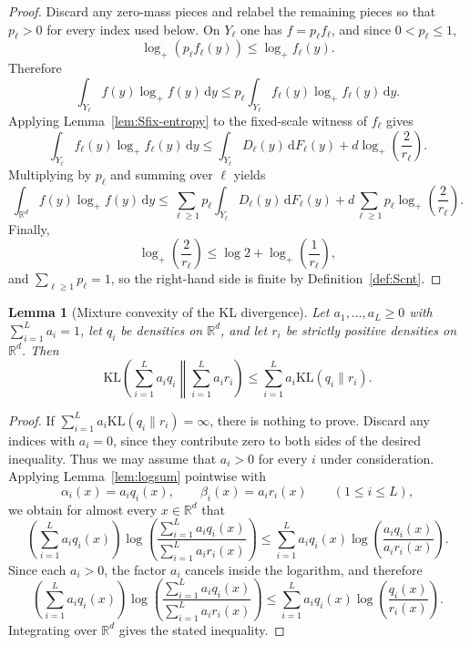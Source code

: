\documentclass[11pt]{article}
\newtheorem{lemma}[theorem]{Lemma}
\theoremstyle{definition}
\begin{document}
\begin{proof}
Discard any zero-mass pieces and relabel the remaining pieces so that $p_\ell>0$ for every index used below. On $Y_\ell$ one has $f=p_\ell f_\ell$, and since $0<p_\ell\le1$,
\[
\log_+\!\left(p_\ell f_\ell(y)\right)\le \log_+ f_\ell(y).
\]
Therefore
\[
\int_{Y_\ell} f(y)\log_+ f(y)\,\mathrm{d}y
\le p_\ell\int_{Y_\ell} f_\ell(y)\log_+ f_\ell(y)\,\mathrm{d}y.
\]
Applying Lemma~\ref{lem:Sfix-entropy} to the fixed-scale witness of $f_\ell$ gives
\[
\int_{Y_\ell} f_\ell(y)\log_+ f_\ell(y)\,\mathrm{d}y
\le
\int_{Y_\ell} D_\ell(y)\,\mathrm{d}F_\ell(y)+d\log_+\!\left(\frac{2}{r_\ell}\right).
\]
Multiplying by $p_\ell$ and summing over $\ell$ yields
\[
\int_{\mathbb{R}^d} f(y)\log_+ f(y)\,\mathrm{d}y
\le
\sum_{\ell\ge1} p_\ell\int_{Y_\ell} D_\ell(y)\,\mathrm{d}F_\ell(y)
+d\sum_{\ell\ge1} p_\ell\log_+\!\left(\frac{2}{r_\ell}\right).
\]
Finally,
\[
\log_+\!\left(\frac{2}{r_\ell}\right)\le \log 2+\log_+\!\left(\frac{1}{r_\ell}\right),
\]
and $\sum_{\ell\ge1}p_\ell=1$, so the right-hand side is finite by Definition~\ref{def:Scnt}.
\end{proof}

\begin{lemma}[Mixture convexity of the KL divergence]
\label{lem:KL-convex}
Let $a_1,\dots,a_L\ge0$ with $\sum_{i=1}^L a_i=1$, let $q_i$ be densities on $\mathbb{R}^d$, and let $r_i$ be strictly positive densities on $\mathbb{R}^d$. Then
\[
\mathrm{KL}\!\left(\sum_{i=1}^L a_i q_i \middle\| \sum_{i=1}^L a_i r_i\right)
\le \sum_{i=1}^L a_i\mathrm{KL}(q_i\|r_i).
\]
\end{lemma}

\begin{proof}
If $\sum_{i=1}^L a_i\mathrm{KL}(q_i\|r_i)=\infty$, there is nothing to prove. Discard any indices with $a_i=0$, since they contribute zero to both sides of the desired inequality. Thus we may assume that $a_i>0$ for every $i$ under consideration. Applying Lemma~\ref{lem:logsum} pointwise with
\[
\alpha_i(x)=a_i q_i(x),
\qquad
\beta_i(x)=a_i r_i(x)
\qquad (1\le i\le L),
\]
we obtain for almost every $x\in\mathbb{R}^d$ that
\[
\left(\sum_{i=1}^L a_i q_i(x)\right)\log\!\left(\frac{\sum_{i=1}^L a_i q_i(x)}{\sum_{i=1}^L a_i r_i(x)}\right)
\le \sum_{i=1}^L a_i q_i(x)\log\!\left(\frac{a_i q_i(x)}{a_i r_i(x)}\right).
\]
Since each $a_i>0$, the factor $a_i$ cancels inside the logarithm, and therefore
\[
\left(\sum_{i=1}^L a_i q_i(x)\right)\log\!\left(\frac{\sum_{i=1}^L a_i q_i(x)}{\sum_{i=1}^L a_i r_i(x)}\right)
\le \sum_{i=1}^L a_i q_i(x)\log\!\left(\frac{q_i(x)}{r_i(x)}\right).
\]
Integrating over $\mathbb{R}^d$ gives the stated inequality.
\end{proof}
\end{document}
